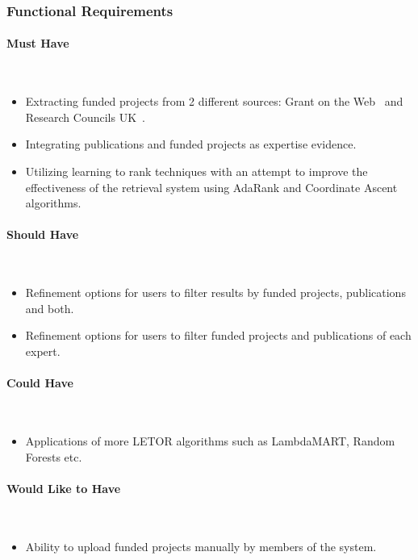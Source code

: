 \subsubsection{Functional Requirements}
\paragraph{Must Have} \hspace{0pt} \\
\begin{itemize}
 \item Extracting funded projects from 2 different sources: Grant on the Web~\cite{gow} and Research Councils UK~\cite{gtr}.
 \item Integrating publications and funded projects as expertise evidence.
 \item Utilizing learning to rank techniques with an attempt to improve the effectiveness of the retrieval system using AdaRank and Coordinate Ascent algorithms.
\end{itemize}

\paragraph{Should Have} \hspace{0pt} \\
\begin{itemize}
 \item Refinement options for users to filter results by funded projects, publications and both.
 \item Refinement options for users to filter funded projects and publications of each expert.
\end{itemize}

\paragraph{Could Have} \hspace{0pt} \\
\begin{itemize}
 \item Applications of more LETOR algorithms such as LambdaMART, Random Forests etc.
\end{itemize}

\paragraph{Would Like to Have} \hspace{0pt} \\
\begin{itemize}
 \item Ability to upload funded projects manually by members of the system.
\end{itemize}

